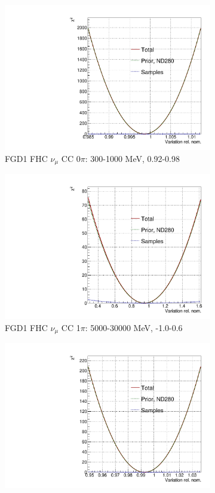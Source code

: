\begin{figure}
\centering
\begin{subfigure}{.49\textwidth}
  \centering
  \includegraphics[width=0.7\linewidth]{figs/llh/ndd_13_llh.pdf}
  \caption{FGD1 FHC $\nu_{\mu}$ CC 0$\pi$: 300-1000 MeV, 0.92-0.98}
\end{subfigure}
\begin{subfigure}{.49\textwidth}
  \centering
  \includegraphics[width=0.7\linewidth]{figs/llh/ndd_136_llh.pdf}
  \caption{FGD1 FHC $\nu_{\mu}$ CC 1$\pi$: 5000-30000 MeV, -1.0-0.6}
\end{subfigure}
\begin{subfigure}{.49\textwidth}
  \centering
  \includegraphics[width=0.7\linewidth]{figs/llh/ndd_541_llh.pdf}

\end{subfigure}
\end{figure}
